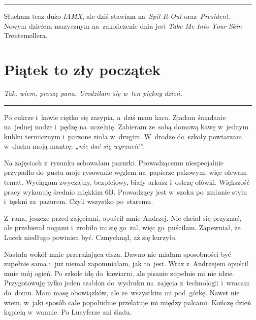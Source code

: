 \documentclass[9pt, a5paper]{memoir}
\begin{document}
\fancybreak{* \quad * \quad *}

Słucham teaz dużo \textit{IAMX}, ale dziś stawiam na~\textit{Spit It Out} oraz~\textit{President}. Nowym dziełem muzycznym na~zakończenie dnia jest \textit{Take Me Into Your Skin} Trentemøllera.

\newpage
\section{Piątek to zły początek}
{
\itshape
Tak, wiem, proszę pana. Urodziłam się w~ten piękny dzień.
}

\fancybreak{* \quad * \quad *}

Po cukrze i~kawie ciężko się zasypia, a~dziś mam kaca. Zjadam śniadanie na~jednej nodze i~pędzę na~uczelnię. Zabieram ze~sobą domową kawę w~jednym kubku termicznym i~parzone zioła w~drugim. W~drodze do~szkoły powtarzam w~duchu moją mantrę: \textit{„nie dać się wyrzucić”}.

Na zajęciach z~rysunku schowałam pazurki. Prowadzącemu niespecjalnie przypadło do~gustu moje rysowanie węglem na~papierze pakowym, więc olewam temat. Wyciągam zwyczajny, bezpłciowy, biały arkusz i~ostrzę ołówki. Większość pracy wykonuję średnio miękkim 6B. Prowadzący jest w~szoku po~zmianie stylu i~tęskni za~pazurem. Czyli wszystko po~staremu.

Z~rana, jeszcze przed zajęciami, opuścił mnie Andrzej. Nie chciał się przyznać, ale przebierał nogami i~zrobiło mi się go~żal, więc go~puściłam. Zapewniał, że Lucek niedługo powinien być. Czmychnął, aż się kurzyło.

Nastała wokół mnie przerażająca cisza. Dawno nie miałam sposobności być zupełnie sama i~już niemal zapomniałam, jak to~jest. Wraz z~Andrzejem opuścił mnie mój ogień. Po szkole idę do~kawiarni, ale pisanie zupełnie mi nie idzie. Przygotowuję tylko jeden szablon do~wydruku na~zajęcia z~technologii i~wracam do~domu. Mam masę obowiązków, ale ze~wszystkim mi pod~górkę. Nawet nie wiem, w~jaki sposób całe popołudnie przelatuje mi między palcami. Kończę dzień kąpielą w~wannie. Po Lucyferze ani śladu.
\end{document}
